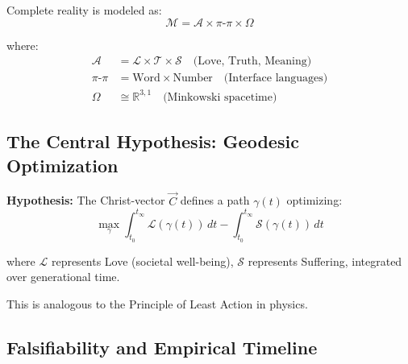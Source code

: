 \documentclass[11pt,a4paper]{article}
\theoremstyle{definition}
\theoremstyle{remark}
\newcommand{\RR}{\mathbb{R}}
\begin{document}
Complete reality is modeled as:
\begin{equation}
\mathcal{M} = \mathcal{A} \times \pi\text{-}\pi \times \Omega
\end{equation}

where:
\begin{align}
\mathcal{A} &= \mathcal{L} \times \mathcal{T} \times \mathcal{S} \quad \text{(Love, Truth, Meaning)}\\
\pi\text{-}\pi &= \text{Word} \times \text{Number} \quad \text{(Interface languages)}\\
\Omega &\cong \RR^{3,1} \quad \text{(Minkowski spacetime)}
\end{align}

\subsection{The Central Hypothesis: Geodesic Optimization}

\begin{mdframed}[backgroundcolor=green!5]
\textbf{Hypothesis:} The Christ-vector $\vec{C}$ defines a path $\gamma(t)$ optimizing:
\begin{equation}
\max_{\gamma} \int_{t_0}^{t_{\infty}} \mathcal{L}(\gamma(t)) \, dt - \int_{t_0}^{t_{\infty}} \mathcal{S}(\gamma(t)) \, dt
\label{eq:geodesic}
\end{equation}

where $\mathcal{L}$ represents Love (societal well-being), $\mathcal{S}$ represents Suffering, integrated over generational time.

This is analogous to the Principle of Least Action in physics.
\end{mdframed}

\subsection{Falsifiability and Empirical Timeline}
\end{document}
